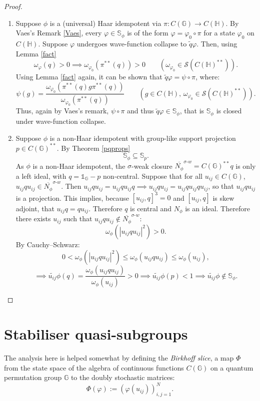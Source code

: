 \documentclass[12pt]{amsart}
\theoremstyle{remark}
\theoremstyle{remark}
\begin{document}
\begin{proof}
\begin{enumerate}
\item[(i)] Suppose $\phi$ is a (universal) Haar idempotent via $\pi:C(\mathbb{G})\to C(\mathbb{H})$. By Vaes's Remark \ref{Vaes}, every $\varphi\in \mathbb{S}_\phi$ is of the form $\varphi=\varphi_0\circ \pi$ for a state $\varphi_0$ on $C(\mathbb{H})$. Suppose $\varphi$ undergoes wave-function collapse to $\widetilde{q}\varphi$. Then, using Lemma \ref{fact}
$$\omega_\varphi(q)>0\implies \omega_{\varphi_0}(\pi^{**}(q))>0\qquad (\omega_{\varphi_0}\in\mathcal{S}(C(\mathbb{H})^{**})).$$ Using Lemma \ref{fact} again, it can be shown that $\widetilde{q}\varphi=\psi\circ \pi$, where:
$$\psi(g)=\frac{\omega_{\varphi_0}(\pi^{**}(q)g\pi^{**}(q))}{\omega_{\varphi_0}(\pi^{**}(q))}\qquad (g\in C(\mathbb{H}),\,\omega_{\varphi_0}\in\mathcal{S}(C(\mathbb{H})^{**})).$$
Thus, again by Vaes's remark, $\psi\circ \pi$ and thus $\widetilde{q}\varphi\in \mathbb{S}_{\phi}$, that is $\mathbb{S}_{\phi}$ is closed under wave-function collapse.
\item[(ii)] Suppose $\phi$ is a non-Haar idempotent with group-like support projection $p\in C(\mathbb{G})^{**}$. By Theorem \ref{pqprops}
$$\mathbb{S}_\phi\subseteq \mathbb{S}_p.$$
 As $\phi$ is a non-Haar idempotent, the $\sigma$-weak closure $\overline{N_\phi}^{\sigma\text{-}w}=C(\mathbb{G})^{**}q$ is only a left ideal, with $q=\mathds{1}_{\mathbb{G}}-p$ non-central. Suppose that for all $u_{ij}\in C(\mathbb{G})$, $u_{ij}q u_{ij}\in \overline{N_\phi}^{\sigma\text{-}w}$. Then $u_{ij}q u_{ij}=u_{ij}q u_{ij}q\implies u_{ij}q u_{ij}=u_{ij}q u_{ij}q u_{ij}$, so that $u_{ij}q u_{ij}$ is a projection. This implies, because $[u_{ij},q]^3=0$ and $[u_{ij},q]$ is skew adjoint, that $u_{ij}q=q u_{ij}$. Therefore $q$ is central and $N_\phi$ is an ideal. Therefore there exists $u_{ij}$ such that $u_{ij}q u_{ij}\not \in \overline{N_\phi}^{\sigma\text{-}w}$:
$$\omega_\phi(|u_{ij}q u_{ij}|^2)>0.$$
By Cauchy--Schwarz:
$$0<\omega_\phi(|u_{ij}q u_{ij}|^2)\leq \omega_\phi(u_{ij}q u_{ij})\leq \omega_\phi(u_{ij}),$$
$$\implies\widetilde{u_{ij}}\phi(q)=\frac{\omega_\phi(u_{ij}q u_{ij})}{\omega_\phi(u_{ij})}>0\implies \widetilde{u_{ij}}\phi(p)<1\implies  \widetilde{u_{ij}}\phi\not\in\mathbb{S}_\phi.$$

\end{enumerate}
\end{proof}




\section{Stabiliser quasi-subgroups}\label{stab}
 The analysis here is helped somewhat by defining the \emph{Birkhoff slice}, a map $\Phi$ from the state space of the algebra of continuous functions $C(\mathbb{G})$ on a quantum permutation group $\mathbb{G}$ to the doubly stochastic matrices:
$$\Phi(\varphi):=(\varphi(u_{ij}))_{i,j=1}^N.$$
\end{document}
